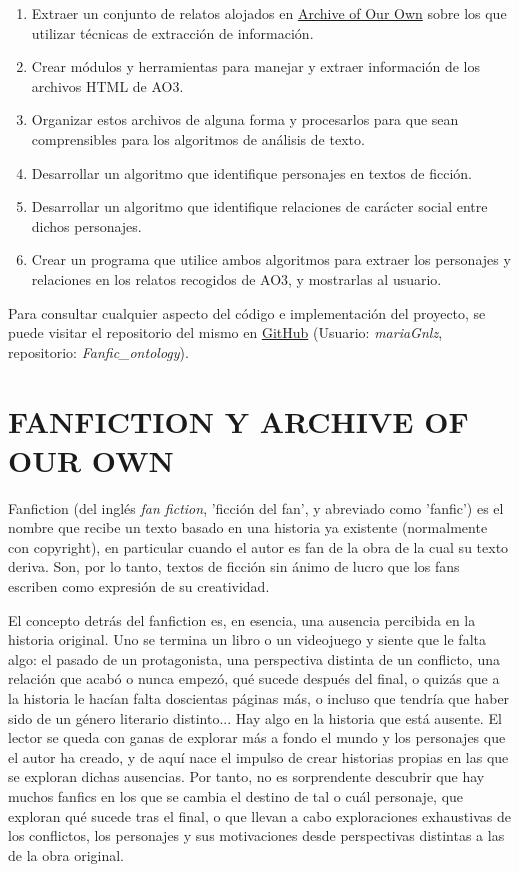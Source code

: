 \documentclass{pre-tfg}
\begin{document}
\begin{enumerate}
	\item Extraer un conjunto de relatos alojados en \href{http://wwww.archiveofourown.org}{Archive of Our Own} sobre los que utilizar técnicas de extracción de información.
	\item Crear módulos y herramientas para manejar y extraer información de los archivos HTML de AO3.
	\item Organizar estos archivos de alguna forma y procesarlos para que sean comprensibles para los algoritmos de análisis de texto.
	\item Desarrollar un algoritmo que identifique personajes en textos de ficción.
	\item Desarrollar un algoritmo que identifique relaciones de carácter social entre dichos personajes.
	\item Crear un programa que utilice ambos algoritmos para extraer los personajes y relaciones en los relatos recogidos de AO3, y mostrarlas al usuario.
\end{enumerate}

Para consultar cualquier aspecto del código e implementación del proyecto, se puede visitar el repositorio del mismo en \href{https://www.github.com/mariaGnlz/Fanfic_ontology}{GitHub} (Usuario: \textit{mariaGnlz}, repositorio: \textit{Fanfic\_ontology}).



\cleardoublepage
\section{FANFICTION Y ARCHIVE OF OUR OWN}

Fanfiction (del inglés \textit{fan fiction}, 'ficción del fan', y abreviado como 'fanfic') es el nombre que recibe un texto basado en una historia ya existente (normalmente con copyright), en particular cuando el autor es fan de la obra de la cual su texto deriva. Son, por lo tanto, textos de ficción sin ánimo de lucro que los fans escriben como expresión de su creatividad.

El concepto detrás del fanfiction es, en esencia, una ausencia percibida en la historia original. Uno se termina un libro o un videojuego y siente que le falta algo: el pasado de un protagonista, una perspectiva distinta de un conflicto, una relación que acabó o nunca empezó, qué sucede después del final, o quizás que a la historia le hacían falta doscientas páginas más, o incluso que tendría que haber sido de un género literario distinto... Hay algo en la historia que está ausente. El lector se queda con ganas de explorar más a fondo el mundo y los personajes que el autor ha creado, y de aquí nace el impulso de crear historias propias en las que se exploran dichas ausencias. Por tanto, no es sorprendente descubrir que hay muchos fanfics en los que se cambia el destino de tal o cuál personaje, que exploran qué sucede tras el final, o que llevan a cabo exploraciones exhaustivas de los conflictos, los personajes y sus motivaciones desde perspectivas distintas a las de la obra original.
\end{document}

